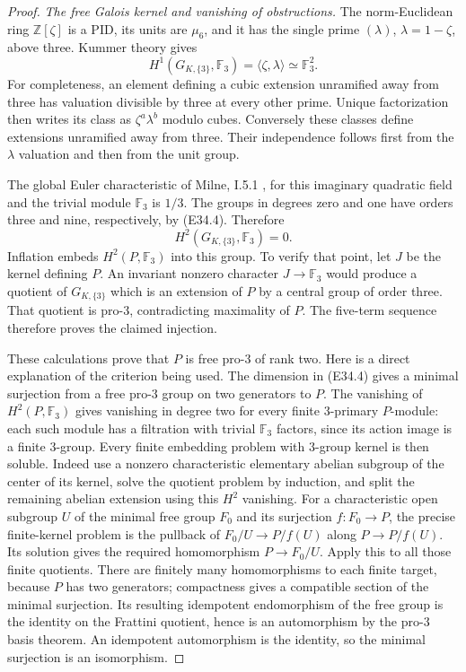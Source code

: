 \begin{proof}
\emph{The free Galois kernel and vanishing of obstructions.}
The norm-Euclidean ring $\mathbb Z[\zeta]$ is a PID, its units
are $\mu_6$, and it has the single prime
$(\lambda)$, $\lambda=1-\zeta$, above three.
Kummer theory gives
\[
 H^1(G_{K,\{3\}},\mathbb F_3)
  =\langle\zeta,\lambda\rangle\simeq\mathbb F_3^2 .
 \tag{E34.4}
\]
For completeness, an element defining a cubic extension
unramified away from three has valuation divisible by three
at every other prime. Unique factorization then writes its
class as $\zeta^a\lambda^b$ modulo cubes.
Conversely these classes define extensions unramified away
from three. Their independence follows first from the
$\lambda$ valuation and then from the unit group.

The global Euler characteristic of
Milne, I.5.1 \cite{E_MilneADT}, for this imaginary quadratic
field and the trivial module $\mathbb F_3$ is $1/3$.
The groups in degrees zero and one have orders three and
nine, respectively, by (E34.4). Therefore
\[
 H^2(G_{K,\{3\}},\mathbb F_3)=0 .
 \tag{E34.5}
\]
Inflation embeds $H^2(P,\mathbb F_3)$ into this group.
To verify that point, let $J$ be the kernel defining $P$.
An invariant nonzero character $J\to\mathbb F_3$ would
produce a quotient of $G_{K,\{3\}}$ which is an extension
of $P$ by a central group of order three. That quotient is
pro-$3$, contradicting maximality of $P$.
The five-term sequence therefore proves the claimed injection.

These calculations prove that $P$ is free pro-$3$ of rank two.
Here is a direct explanation of the criterion being used.
The dimension in (E34.4) gives a minimal surjection from a
free pro-$3$ group on two generators to $P$.
The vanishing of $H^2(P,\mathbb F_3)$ gives vanishing in
degree two for every finite $3$-primary $P$-module:
each such module has a filtration with trivial
$\mathbb F_3$ factors, since its action image is a finite
$3$-group. Every finite embedding problem with $3$-group
kernel is then soluble. Indeed use a nonzero characteristic
elementary abelian subgroup of the center of its kernel,
solve the quotient problem by induction, and split the
remaining abelian extension using this $H^2$ vanishing.
For a characteristic open subgroup $U$ of the minimal free
group $F_0$ and its surjection $f:F_0\to P$, the precise
finite-kernel problem is the pullback of
$F_0/U\to P/f(U)$ along $P\to P/f(U)$.
Its solution gives the required homomorphism $P\to F_0/U$.
Apply this to all those finite quotients.
There are finitely many homomorphisms to each finite target,
because $P$ has two generators; compactness gives a compatible
section of the minimal surjection. Its resulting idempotent
endomorphism of the free group is the identity on the
Frattini quotient, hence is an automorphism by the pro-$3$
basis theorem. An idempotent automorphism is the identity,
so the minimal surjection is an isomorphism.


\end{proof}
